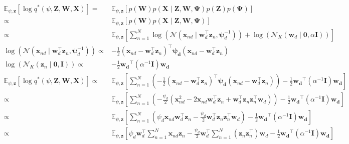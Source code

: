 \documentclass{article}
\begin{document}
\begin{align}
	\mathbb{E}_{\psi, \mathbf{z}}\left[ \log q^*(\psi, \mathbf{Z}, \mathbf{W}, \mathbf{X})\right] 
	=& \mathbb{E}_{\psi, \mathbf{z}}[p(\mathbf{W})p(\mathbf{X}\mid\mathbf{Z},\mathbf{W},\mathbf{\Psi})p(\mathbf{Z})p(\mathbf{\Psi})]\\
	\propto&\mathbb{E}_{\psi, \mathbf{z}}[p(\mathbf{W})p(\mathbf{X}\mid\mathbf{Z},\mathbf{W},\mathbf{\Psi})] \\
	\propto&\mathbb{E}_{\psi, \mathbf{z}}[ \sum_{n=1}^{N}\log\left( \mathcal{N}(\mathbf{x}_{nd} \mid \mathbf{w}_d^\top \mathbf{z}_{n},\mathbf{\psi}_d^{-1})\right) +  \log\left(\mathcal{N}_{K}(\mathbf{w}_d\mid\mathbf{0,}\alpha\mathbf{I})\right)] \\
	\log\left( \mathcal{N}(\mathbf{x}_{nd} \mid \mathbf{w}_d^\top \mathbf{z}_{n},\mathbf{\psi}_d^{-1})\right) \propto& -\frac{1}{2}(\mathbf{x}_{nd} -\mathbf{w}_d^\top\mathbf{z}_{n})^\top\mathbf{\psi_d}(\mathbf{x}_{nd} -\mathbf{w}_d^\top\mathbf{z}_{n}) \\
	\log\left( \mathcal{N}_{K}(\mathbf{z}_n\mid \mathbf{0,I})\right)  \propto& -\frac{1}{2} \mathbf{w_d}^\top(\alpha^{-1}\mathbf{I})\mathbf{w_d} \\
	\mathbb{E}_{\psi, \mathbf{z}}\left[ \log q^*(\psi, \mathbf{Z}, \mathbf{W}, \mathbf{X})\right] \propto& \mathbb{E}_{\psi, \mathbf{z}}\left[\sum_{n=1}^{N}\left(-\frac{1}{2}(\mathbf{x}_{nd}-\mathbf{w}_d^\top\mathbf{z}_{n})^\top\mathbf{\psi_d}(\mathbf{x}_{nd} -\mathbf{w}_d^\top\mathbf{z}_{n})\right)-\frac{1}{2} \mathbf{w_d}^\top(\alpha^{-1}\mathbf{I})\mathbf{w_d} \right] \\
	\propto& \mathbb{E}_{\psi, \mathbf{z}}\left[\sum_{n=1}^{N}\left(-\frac{\psi_d}{2}(\mathbf{x}_{nd}^2-2\mathbf{x}_{nd}\mathbf{w}_d^\top\mathbf{z}_{n}+\mathbf{w}_d^\top\mathbf{z}_{n}\mathbf{z}_{n}^\top\mathbf{w}_d)\right)-\frac{1}{2} \mathbf{w_d}^\top(\alpha^{-1}\mathbf{I})\mathbf{w_d} \right] \\
	\propto& \mathbb{E}_{\psi, \mathbf{z}}\left[\sum_{n=1}^{N}\left(\psi_d\mathbf{x}_{nd}\mathbf{w}_d^\top\mathbf{z}_{n}-\frac{\psi_d}{2}\mathbf{w}_d^\top\mathbf{z}_{n}\mathbf{z}_{n}^\top\mathbf{w}_d\right)-\frac{1}{2} \mathbf{w_d}^\top(\alpha^{-1}\mathbf{I})\mathbf{w_d} \right] \\
	\propto& \mathbb{E}_{\psi, \mathbf{z}}\left[\psi_d\mathbf{w}_d^\top\sum_{n=1}^{N}\mathbf{x}_{nd}\mathbf{z}_{n}-\frac{\psi_d}{2}\mathbf{w}_d^\top\sum_{n=1}^{N}\left( \mathbf{z}_{n}\mathbf{z}_{n}^\top\right) \mathbf{w}_d-\frac{1}{2} \mathbf{w_d}^\top(\alpha^{-1}\mathbf{I})\mathbf{w_d} \right] \\

\end{align}
\end{document}
